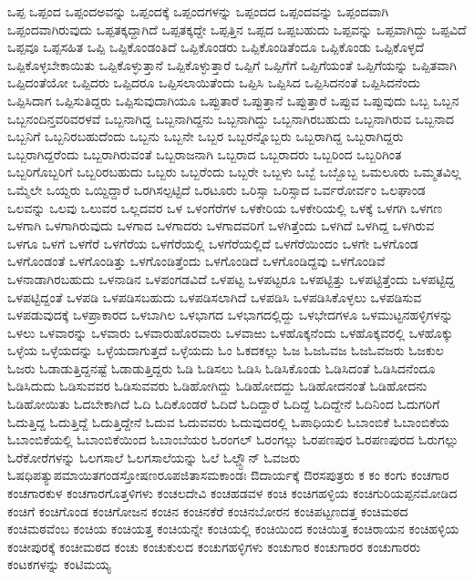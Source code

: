 {ಒಪ್ಪ
ಒಪ್ಪಂದ
ಒಪ್ಪಂದಅವನ್ನು
ಒಪ್ಪಂದಕ್ಕೆ
ಒಪ್ಪಂದಗಳನ್ನು
ಒಪ್ಪಂದದ
ಒಪ್ಪಂದವನ್ನು
ಒಪ್ಪಂದವಾಗಿ
ಒಪ್ಪಂದವಾಗಿರುವುದು
ಒಪ್ಪತಕ್ಕದ್ದಾಗಿದೆ
ಒಪ್ಪತಕ್ಕದ್ದೇ
ಒಪ್ಪತ್ತಿನ
ಒಪ್ಪದ
ಒಪ್ಪಬಹುದು
ಒಪ್ಪವನ್ನು
ಒಪ್ಪವಾಗಿದ್ದು
ಒಪ್ಪವಿದೆ
ಒಪ್ಪವೂ
ಒಪ್ಪಸಹಿತ
ಒಪ್ಪಿ
ಒಪ್ಪಿಕೊಂಡಂತಿದೆ
ಒಪ್ಪಿಕೊಂಡರು
ಒಪ್ಪಿಕೊಂಡಿತೆಂದೂ
ಒಪ್ಪಿಕೊಂಡು
ಒಪ್ಪಿಕೊಳ್ಳದೆ
ಒಪ್ಪಿಕೊಳ್ಳಬೇಕಾಯಿತು
ಒಪ್ಪಿಕೊಳ್ಳುತ್ತಾನೆ
ಒಪ್ಪಿಕೊಳ್ಳುತ್ತಾರೆ
ಒಪ್ಪಿಗೆ
ಒಪ್ಪಿಗೆಗೆ
ಒಪ್ಪಿಗೆಯಂತೆ
ಒಪ್ಪಿಗೆಯನ್ನು
ಒಪ್ಪಿತವಾಗಿ
ಒಪ್ಪಿದಂತೆಯೋ
ಒಪ್ಪಿದರು
ಒಪ್ಪಿದರೂ
ಒಪ್ಪಿಸಲಾಯಿತೆಂದು
ಒಪ್ಪಿಸಿ
ಒಪ್ಪಿಸಿದ
ಒಪ್ಪಿಸಿದನಂತೆ
ಒಪ್ಪಿಸಿದನೆಂದು
ಒಪ್ಪಿಸಿದಾಗ
ಒಪ್ಪಿಸುತಿದ್ದರು
ಒಪ್ಪಿಸುವುದಾಗಿಯೂ
ಒಪ್ಪುತಾರೆ
ಒಪ್ಪುತ್ತಾನೆ
ಒಪ್ಪುತ್ತಾರೆ
ಒಪ್ಪುವ
ಒಪ್ಪುವುದು
ಒಬ್ಬ
ಒಬ್ಬನ
ಒಬ್ಬನಂದಿನ್ತವರಿವರಳವೆ
ಒಬ್ಬನಾಗಿದ್ದ
ಒಬ್ಬನಾಗಿದ್ದನು
ಒಬ್ಬನಾಗಿದ್ದು
ಒಬ್ಬನಾಗಿರಬಹುದು
ಒಬ್ಬನಾಗಿರುವ
ಒಬ್ಬನಾದ
ಒಬ್ಬನಿಗೆ
ಒಬ್ಬನಿರಬಹುದೆಂದು
ಒಬ್ಬನು
ಒಬ್ಬನೇ
ಒಬ್ಬರ
ಒಬ್ಬರನ್ನೊಬ್ಬರು
ಒಬ್ಬರಾಗಿದ್ದ
ಒಬ್ಬರಾಗಿದ್ದರು
ಒಬ್ಬರಾಗಿದ್ದರೆಂದು
ಒಬ್ಬರಾಗಿರುವಂತೆ
ಒಬ್ಬರಾಜನಾಗಿ
ಒಬ್ಬರಾದ
ಒಬ್ಬರಾದರು
ಒಬ್ಬರಿಂದ
ಒಬ್ಬರಿಗಿಂತ
ಒಬ್ಬರಿಗೊಬ್ಬರಿಗೆ
ಒಬ್ಬರಿರಬಹುದು
ಒಬ್ಬರು
ಒಬ್ಬರೆಂದು
ಒಬ್ಬರೇ
ಒಬ್ಬಳು
ಒಬ್ಬೆ
ಒಬ್ಬೊಬ್ಬ
ಒಮಲೂರು
ಒಮ್ಮತವಿಲ್ಲ
ಒಮ್ಮೆಲೇ
ಒಯ್ದರು
ಒಯ್ದಿದ್ದಾರೆ
ಒರಗಿಸಲ್ಪಟ್ಟಿದೆ
ಒರಟೂರು
ಒರಿಸ್ಸಾ
ಒರಿಸ್ಸಾದ
ಒರ್ವರೋರ್ವಂ
ಒಲಘಾಂಡ
ಒಲವನ್ನು
ಒಲವು
ಒಲುವರ
ಒಲ್ಲದವರ
ಒಳ
ಒಳಂಗೆರೆಗಳ
ಒಳಕೇರಿಯ
ಒಳಕೇರಿಯಲ್ಲಿ
ಒಳಕ್ಕೆ
ಒಳಗಗಿ
ಒಳಗಣ
ಒಳಗಾಗಿ
ಒಳಗಾಗಿರುವುದು
ಒಳಗಾದ
ಒಳಗಾದರು
ಒಳಗಾದವರಿಗೆ
ಒಳಗಿತ್ತೆಂದು
ಒಳಗಿದೆ
ಒಳಗಿದ್ದ
ಒಳಗಿರುವ
ಒಳಗೂ
ಒಳಗೆ
ಒಳಗೆರೆ
ಒಳಗೆರೆಯ
ಒಳಗೆರೆಯಲ್ಲಿ
ಒಳಗೆರೆಯಲ್ಲಿದೆ
ಒಳಗೆರೆಯಿಂದಂ
ಒಳಗೇ
ಒಳಗೊಂಡ
ಒಳಗೊಂಡಂತೆ
ಒಳಗೊಂಡಿತ್ತು
ಒಳಗೊಂಡಿತ್ತೆಂದು
ಒಳಗೊಂಡಿದೆ
ಒಳಗೊಂಡಿದ್ದವು
ಒಳಗೊಂಡಿವೆ
ಒಳನಾಡಾಗಿರಬಹುದು
ಒಳನಾಡಿನ
ಒಳಪಂಗಡವಿದೆ
ಒಳಪಟ್ಟ
ಒಳಪಟ್ಟರೂ
ಒಳಪಟ್ಟಿತ್ತು
ಒಳಪಟ್ಟಿತ್ತೆಂದು
ಒಳಪಟ್ಟಿದ್ದ
ಒಳಪಟ್ಟಿದ್ದಂತೆ
ಒಳಪಡಿ
ಒಳಪಡಿಸಬಹುದು
ಒಳಪಡಿಸಲಾಗಿದೆ
ಒಳಪಡಿಸಿ
ಒಳಪಡಿಸಿಕೊಳ್ಳಲು
ಒಳಪಡಿಸುವ
ಒಳಪಡುವುದಕ್ಕೆ
ಒಳಪ್ರಾಕಾರದ
ಒಳಬಾಗಿಲ
ಒಳಭಾಗದ
ಒಳಭಾಗದಲ್ಲಿದ್ದು
ಒಳಭೇದಗಳೂ
ಒಳಮುಟ್ಟನಹಳ್ಳಿಗಳನ್ನು
ಒಳಲು
ಒಳವಾರನ್ನು
ಒಳವಾರು
ಒಳವಾರುಹೊರವಾರು
ಒಳವಾಱು
ಒಳಹೊಕ್ಕನೆಂದು
ಒಳಹೊಕ್ಕವರಲ್ಲಿ
ಒಳಹೊಕ್ಕು
ಒಳ್ಳೆಯ
ಒಳ್ಳೆಯದನ್ನು
ಒಳ್ಳೆಯದಾಗುತ್ತದೆ
ಒಳ್ಳೆಯದು
ಓಂ
ಓಕದಕಲ್ಲು
ಓಜ
ಓಜಓವಜ
ಓಜಓವಜರು
ಓಜಕುಲ
ಓಜರು
ಓಡಾಡುತ್ತಿದ್ದನಷ್ಟೆ
ಓಡಾಡುತ್ತಿದ್ದರು
ಓಡಿ
ಓಡಿಸಲು
ಓಡಿಸಿ
ಓಡಿಸಿಕೊಂಡು
ಓಡಿಸಿದಂತೆ
ಓಡಿಸಿದನೆಂದೂ
ಓಡಿಸಿದುದು
ಓಡಿಸುವವರ
ಓಡಿಸುವವರು
ಓಡಿಹೋಗಿದ್ದು
ಓಡಿಹೋದದ್ದು
ಓಡಿಹೋದನಂತೆ
ಓಡಿಹೋದನು
ಓಡಿಹೋಯಿತು
ಓದಬೇಕಾಗಿದೆ
ಓದಿ
ಓದಿಕೊಂಡರೆ
ಓದಿದೆ
ಓದಿದ್ದಾರೆ
ಓದಿದ್ದೆ
ಓದಿದ್ದೇನೆ
ಓದಿನಿಂದ
ಓದುಗರಿಗೆ
ಓದುತ್ತಿದ್ದ
ಓದುತ್ತಿದ್ದೆ
ಓದುತ್ತಿದ್ದೇನೆ
ಓದುವ
ಓದುವವರು
ಓದುವುದರಲ್ಲಿ
ಓಪಾಧಿಯಲಿ
ಓಬಾಂಬಿಕೆ
ಓಬಾಂಬಿಕೆಯ
ಓಬಾಂಬಿಕೆಯಲ್ಲಿ
ಓಬಾಂಬಿಕೆಯಿಂದ
ಓಬಾಂಬೆಯರ
ಓರಂಗಲ್
ಓರಂಗಲ್ಲು
ಓರಪಣಪುರ
ಓರಪಣಪುರದ
ಓರುಗಲ್ಲು
ಓರೆಕೋರೆಗಳನ್ನು
ಓಲಗಸಾಲೆ
ಓಲಗಸಾಲೆಯನ್ನು
ಓಲೆ
ಓಲ್ಡ್ಟೌನ್
ಓವಜರು
ಓಷಧಿಪತ್ಯುಪಮಾಯಿತಗಂಡಸ್ತೋಷಣರೂಪಜಿತಾಸಮಕಾಂಡಃ
ಔದಾರ್ಯಕ್ಕೆ
ಔರಸಪುತ್ರರು
ಕ
ಕಂ
ಕಂಗು
ಕಂಚಗಾರ
ಕಂಚಗಾರಕುಳ
ಕಂಚಗಾರಗೊತ್ತಳಿಗಳು
ಕಂಚಲದೇವಿ
ಕಂಚಹಡವಳ
ಕಂಚಿ
ಕಂಚಿಗಹಳ್ಳಿಯ
ಕಂಚಿಗುರಿಯಪ್ಪನಮೋಡಿದ
ಕಂಚಿಗೆ
ಕಂಚಿಗೊಂಡ
ಕಂಚಿಗೋಜನ
ಕಂಚಿನ
ಕಂಚಿನಕೆರೆ
ಕಂಚಿನಬೋರನ
ಕಂಚಿಪಟ್ಟಣದತ್ತ
ಕಂಚಿಮಠದ
ಕಂಚಿಮಠವೆಂಬ
ಕಂಚಿಯ
ಕಂಚಿಯತ್ತ
ಕಂಚಿಯನ್ನೇ
ಕಂಚಿಯಲ್ಲಿ
ಕಂಚಿಯಿಂದ
ಕಂಚಿಯಿತ್ತ
ಕಂಚಿರಾಯನ
ಕಂಚಿಹಳ್ಳಿಯ
ಕಂಚೀಪುರಕ್ಕೆ
ಕಂಚೀಮಠದ
ಕಂಚು
ಕಂಚುಕುಲದ
ಕಂಚುಗಹಳ್ಳಿಗಳು
ಕಂಚುಗಾರ
ಕಂಚುಗಾರರ
ಕಂಚುಗಾರರು
ಕಂಟಕಗಳನ್ನು
ಕಂಟಿಮಯ್ಯ
}
